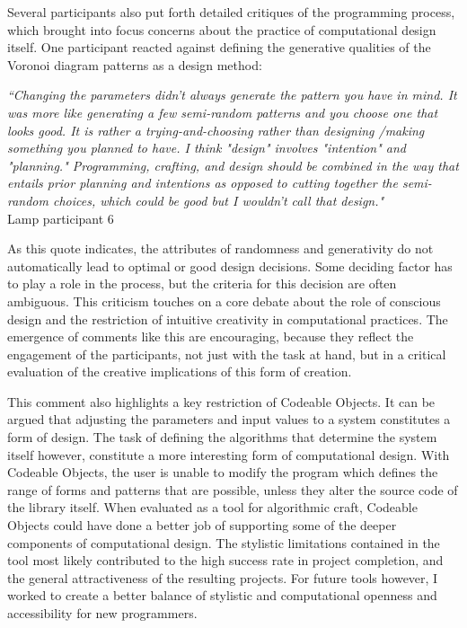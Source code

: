 Several participants also put forth detailed critiques of the programming process, which brought into focus concerns about the practice of computational design itself. One participant reacted against defining the generative qualities of the Voronoi diagram patterns as a design method:
\begin{flushright}
 \textit{``Changing the parameters didn't always generate the pattern you have in mind. It was more like generating a few semi-random patterns and you choose one that looks good. It is rather a trying-and-choosing rather than designing /making something you planned to have. I think "design" involves "intention" and "planning." Programming, crafting, and design should be combined in the way that entails prior planning and intentions as opposed to cutting together the semi-random choices, which could be good but I wouldn't call that design."}
 \\Lamp participant 6
 \end{flushright}
 
As this quote indicates, the attributes of randomness and generativity do not automatically lead to optimal or good design decisions. Some deciding factor has to play a role in the process, but the criteria for this decision are often ambiguous. This criticism touches on a core debate about the role of conscious design and the restriction of intuitive creativity in computational practices. The emergence of comments like this are encouraging, because they reflect the engagement of the participants, not just with the task at hand, but in a critical evaluation of the  creative implications of this form of creation. 

This comment also highlights a key restriction of Codeable Objects. It can be argued that adjusting the parameters and input values to a system constitutes a form of design. The task of defining the algorithms that determine the system itself however, constitute a more interesting form of computational design. With Codeable Objects, the user is unable to modify the program which defines the range of forms and patterns that are possible, unless they alter the source code of the library itself. When evaluated as a tool for algorithmic craft, Codeable Objects could have done a better job of supporting some of the deeper components of computational design. The stylistic limitations contained in the tool most likely contributed to the high success rate in project completion, and the general attractiveness of the resulting projects. For future tools however, I worked to create a better balance of stylistic and computational openness and accessibility for new programmers. 

